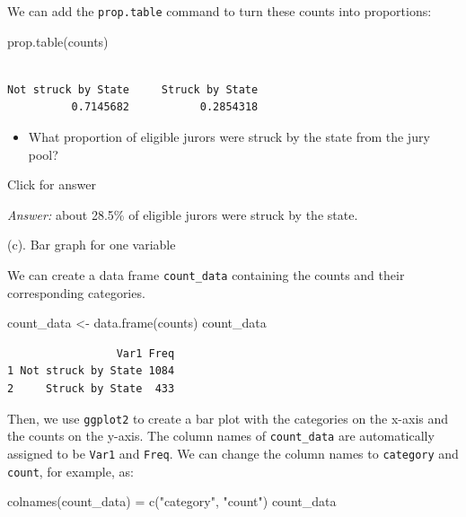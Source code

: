\documentclass[
]{book}
\newenvironment{Shaded}{\begin{snugshade}}{\end{snugshade}}
\newcommand{\FunctionTok}[1]{\textcolor[rgb]{0.00,0.00,0.00}{#1}}
\newcommand{\NormalTok}[1]{#1}
\newcommand{\OtherTok}[1]{\textcolor[rgb]{0.56,0.35,0.01}{#1}}
\newcommand{\StringTok}[1]{\textcolor[rgb]{0.31,0.60,0.02}{#1}}
\providecommand{\tightlist}{%
  \setlength{\itemsep}{0pt}\setlength{\parskip}{0pt}}
\begin{document}
We can add the \texttt{prop.table} command to turn these counts into proportions:

\begin{Shaded}
\begin{Highlighting}[]
\FunctionTok{prop.table}\NormalTok{(counts)}
\end{Highlighting}
\end{Shaded}

\begin{verbatim}

Not struck by State     Struck by State 
          0.7145682           0.2854318 
\end{verbatim}

\begin{itemize}
\tightlist
\item
  What proportion of eligible jurors were struck by the state from the jury pool?
\end{itemize}

Click for answer

\emph{Answer:} about 28.5\% of eligible jurors were struck by the state.

(c). Bar graph for one variable

We can create a data frame \texttt{count\_data} containing the counts and their corresponding categories.

\begin{Shaded}
\begin{Highlighting}[]
\NormalTok{count\_data }\OtherTok{\textless{}{-}} \FunctionTok{data.frame}\NormalTok{(counts)}
\NormalTok{count\_data}
\end{Highlighting}
\end{Shaded}

\begin{verbatim}
                 Var1 Freq
1 Not struck by State 1084
2     Struck by State  433
\end{verbatim}

Then, we use \texttt{ggplot2} to create a bar plot with the categories on the x-axis and the counts on the y-axis. The column names of \texttt{count\_data} are automatically assigned to be \texttt{Var1} and \texttt{Freq}. We can change the column names to \texttt{category} and \texttt{count}, for example, as:

\begin{Shaded}
\begin{Highlighting}[]
\FunctionTok{colnames}\NormalTok{(count\_data) }\OtherTok{=} \FunctionTok{c}\NormalTok{(}\StringTok{"category"}\NormalTok{, }\StringTok{"count"}\NormalTok{)}
\NormalTok{count\_data}
\end{Highlighting}
\end{Shaded}
\end{document}
